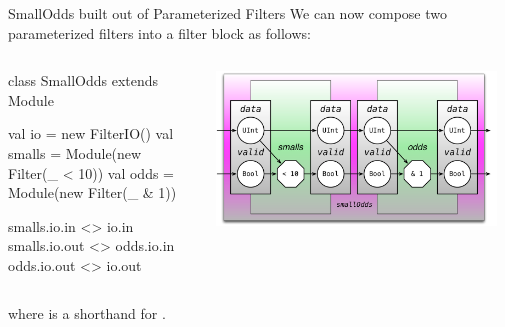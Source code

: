 \documentclass[xcolor=pdflatex,dvipsnames,table]{beamer}
\begin{document}
\begin{frame}[fragile]{SmallOdds built out of Parameterized Filters}
We can now compose two parameterized filters into a filter block as follows:

\begin{columns}

{
\begin{scala}
class SmallOdds extends Module { 
  val io     = new FilterIO()
  val smalls = 
    Module(new Filter(_ < 10))
  val odds   = 
    Module(new Filter(_ & 1))

  smalls.io.in  <> io.in
  smalls.io.out <> odds.io.in
  odds.io.out   <> io.out
}
\end{scala}
}


\begin{center}
\includegraphics[width=0.95\textwidth]{figs/small-odds.pdf} 
\end{center}

\end{columns}

\noindent
where  is a shorthand for .
\end{frame}
\end{document}

